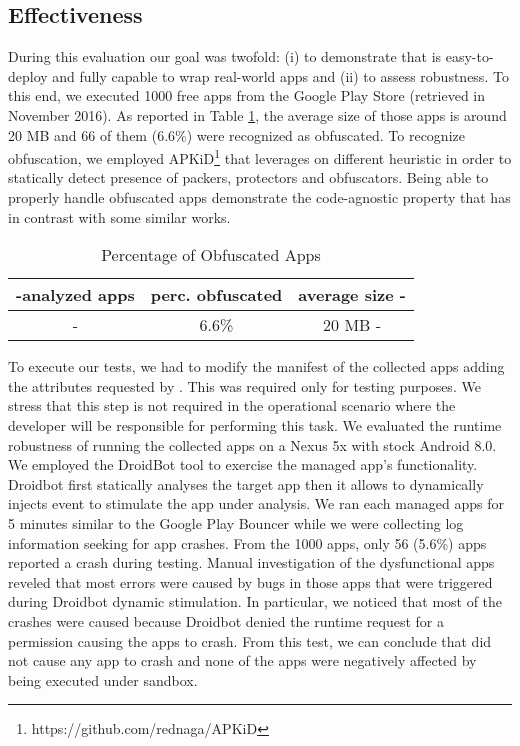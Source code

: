 \subsection{Effectiveness}
During this evaluation our goal was twofold: (i) to demonstrate that \asd is easy-to-deploy and fully capable to wrap real-world apps  and (ii) to assess \asd robustness. To this end, we executed 1000 free apps from the Google Play Store (retrieved in November 2016). As reported in Table \ref{tab:stats}, the average size of those apps is around 20 MB and 66 of them (6.6\%) were recognized as obfuscated. To recognize obfuscation, we employed APKiD\footnote{https://github.com/rednaga/APKiD} that leverages on different heuristic in order to statically detect presence of packers, protectors and obfuscators. Being able to properly handle obfuscated apps demonstrate the code-agnostic property that \asd has in contrast with some similar works. 

\begin{table}[H]
\caption{Percentage of Obfuscated Apps}
\label{tab:stats}
\centering
{}
\begin{tabular}{>{\kern-\tabcolsep}ccc<{\kern-\tabcolsep}}\toprule
analyzed apps & perc. obfuscated & average size \\
\midrule
1000 & 6.6\% & 20 MB \\
\bottomrule
\end{tabular}
\end{table}


To execute our tests, we had to modify the manifest of the collected apps adding the attributes requested by \asd. This was required only for testing purposes. We stress that this step is not required in the operational scenario where the developer will be responsible for performing this task. We evaluated the runtime robustness of \asd running the collected apps on a Nexus 5x with stock Android 8.0. We employed the DroidBot\cite{droidbot} tool to exercise the managed app's functionality. Droidbot first statically analyses the target app then it allows to dynamically injects event to stimulate the app under analysis. We ran each managed apps for 5 minutes similar to the Google Play Bouncer \cite{oberheide2012dissecting} while we were collecting log information seeking for app crashes. From the 1000 apps, only 56 (5.6\%) apps reported a crash during testing.  Manual investigation of the dysfunctional apps reveled that most errors were caused by  bugs in those apps that were triggered during Droidbot dynamic stimulation. In particular, we noticed that most of the crashes were caused because Droidbot denied the runtime request for a permission causing the apps to crash.
From this test, we can conclude that \asd did not cause any app to crash and none of the apps were negatively affected by being executed under \asd sandbox. 

